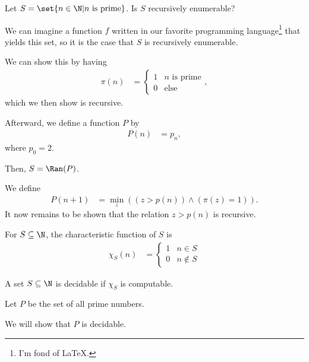 \documentclass[10pt]{mypackage}
\begin{document}
\begin{example}
  Let $S = \set{n\in \N | n\text{ is prime}}$. Is $S$ recursively enumerable?\newline

  We can imagine a function $f$ written in our favorite programming language\footnote{I'm fond of \LaTeX.} that yields this set, so it is the case that $S$ is recursively enumerable.\newline

  We can show this by having
  \begin{align*}
    \pi(n) &= \begin{cases}
      1 & \text{$n$ is prime}\\
      0 & \text{else}
    \end{cases},
  \end{align*}
  which we then show is recursive.\newline

  Afterward, we define a function $P$ by
  \begin{align*}
    P(n) &= p_{n},
  \end{align*}
  where $p_0 = 2$.\newline

  Then, $S = \Ran(P)$.\newline

  We define
  \begin{align*}
    P\left(n+1\right) &= \min_{z}\left(\left(z > p(n)\right) \wedge \left(\pi(z) = 1\right)\right).
  \end{align*}
  It now remains to be shown that the relation $z > p(n)$ is recursive.
\end{example}
\begin{definition}
For $S\subseteq \N$, the characteristic function of $S$ is
\begin{align*}
  \chi_{S}(n) &= \begin{cases}
    1 & n\in S\\
    0 & n\notin S
  \end{cases}
\end{align*}
\end{definition}
\begin{definition}
  A set $S\subseteq \N$ is decidable if $\chi_S$ is computable.
\end{definition}
\begin{example}
  Let $P$ be the set of all prime numbers.\newline

  We will show that $P$ is decidable.
\end{example}
\end{document}
